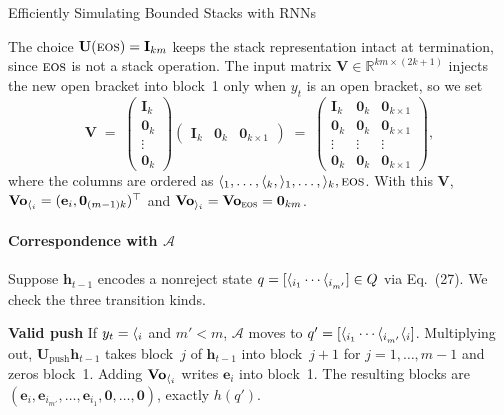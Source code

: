 \begin{question}{Efficiently Simulating Bounded Stacks with RNNs}
\begin{subquestion}
\[    \]
    The choice $\mathbf{U}(\eos) = \mathbf{I}_{km}$ keeps the stack representation intact at termination, since $\eos$ is not a stack operation. 
    The input matrix $\mathbf{V} \in \mathbb{R}^{km \times (2k+1)}$ injects the new open bracket into block~1 only when $y_t$ is an open bracket, so we set
    \[
        \mathbf{V} \;=\;
        \begin{pmatrix}
            \mathbf{I}_k \\
            \mathbf{0}_k \\
            \vdots \\
            \mathbf{0}_k
        \end{pmatrix}
        \begin{pmatrix} \mathbf{I}_k & \mathbf{0}_k & \mathbf{0}_{k\times 1} \end{pmatrix}
        \;=\;
        \begin{pmatrix}
            \mathbf{I}_k & \mathbf{0}_k & \mathbf{0}_{k\times 1} \\
            \mathbf{0}_k & \mathbf{0}_k & \mathbf{0}_{k\times 1} \\
            \vdots & \vdots & \vdots \\
            \mathbf{0}_k & \mathbf{0}_k & \mathbf{0}_{k\times 1}
        \end{pmatrix},
    \]
    where the columns are ordered as $\openBr{1}, \dots, \openBr{k}, \closeBr{1}, \dots, \closeBr{k}, \eos$. 
    With this $\mathbf{V}$, $\mathbf{V}\mathbf{o}_{\openBr{i}} = (\mathbf{e}_i, \mathbf{0}_{(m-1)k})^\top$ and $\mathbf{V}\mathbf{o}_{\closeBr{i}} = \mathbf{V}\mathbf{o}_{\eos} = \mathbf{0}_{km}$.

    \paragraph{Correspondence with $\mathcal{A}$} Suppose $\mathbf{h}_{t-1}$ encodes a nonreject state $q = [\openBr{i_1}\cdots\openBr{i_{m'}}] \in \states$ via Eq.~(27). We check the three transition kinds.

    \textbf{Valid push} If $y_t = \openBr{i}$ and $m' < m$, $\mathcal{A}$ moves to $q' = [\openBr{i_1}\cdots\openBr{i_{m'}}\openBr{i}]$. 
    Multiplying out, $\mathbf{U}_{\text{push}}\mathbf{h}_{t-1}$ takes block~$j$ of $\mathbf{h}_{t-1}$ into block~$j{+}1$ for $j = 1, \dots, m{-}1$ and zeros block~1. 
    Adding $\mathbf{V}\mathbf{o}_{\openBr{i}}$ writes $\mathbf{e}_i$ into block~1. 
    The resulting blocks are $(\mathbf{e}_i, \mathbf{e}_{i_{m'}}, \dots, \mathbf{e}_{i_1}, \mathbf{0}, \dots, \mathbf{0})$, exactly $h(q')$.


\end{subquestion}
\end{question}
